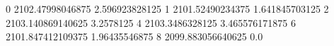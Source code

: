 0 2102.47998046875 2.596923828125
1 2101.52490234375 1.641845703125
2 2103.140869140625 3.2578125
4 2103.3486328125 3.465576171875
6 2101.847412109375 1.96435546875
8 2099.883056640625 0.0
